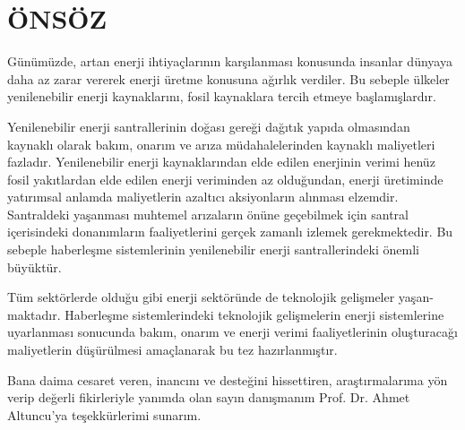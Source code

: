 \chapter*{ÖNSÖZ}


Günümüzde, artan enerji ihtiyaçlarının karşılanması konusunda insanlar dünyaya daha az zarar vererek enerji üretme konusuna ağırlık verdiler. Bu sebeple ülkeler yenilenebilir enerji kaynaklarını, fosil kaynaklara tercih etmeye başlamışlardır.

Yenilenebilir enerji santrallerinin doğası gereği dağıtık yapıda olmasından kaynaklı olarak bakım, onarım ve arıza müdahalelerinden kaynaklı maliyetleri fazladır. Yenilenebilir enerji kaynaklarından elde edilen enerjinin verimi henüz fosil yakıtlardan elde edilen enerji veriminden az olduğundan, enerji üretiminde yatırımsal anlamda maliyetlerin azaltıcı aksiyonların alınması elzemdir. Santraldeki yaşanması muhtemel arızaların önüne geçebilmek için santral içerisindeki donanımların faaliyetlerini gerçek zamanlı izlemek gerekmektedir. Bu sebeple haberleşme sistemlerinin yenilenebilir enerji santrallerindeki önemli büyüktür. 

Tüm sektörlerde olduğu gibi enerji sektöründe de teknolojik gelişmeler yaşan-maktadır. Haberleşme sistemlerindeki teknolojik gelişmelerin enerji sistemlerine uyarlanması sonucunda bakım, onarım ve enerji verimi faaliyetlerinin oluşturacağı maliyetlerin düşürülmesi amaçlanarak bu tez hazırlanmıştır.

Bana daima cesaret veren, inancını ve desteğini hissettiren, araştırmalarıma yön verip değerli fikirleriyle yanımda olan sayın danışmanım Prof. Dr. Ahmet Altuncu'ya teşekkürlerimi sunarım.
